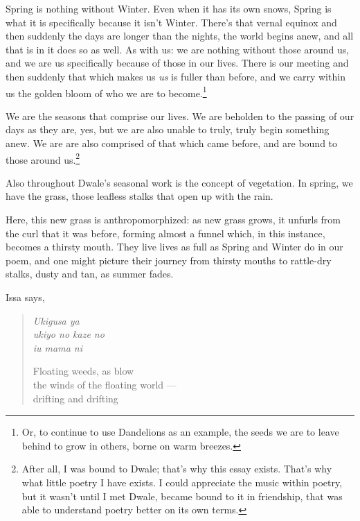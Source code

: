 \documentclass[12pt]{memoir}
\begin{document}
Spring is nothing without Winter. Even when it has its own snows, Spring is what it is specifically because it isn't Winter. There's that vernal equinox and then suddenly the days are longer than the nights, the world begins anew, and all that is in it does so as well. As with us: we are nothing without those around us, and we are us specifically because of those in our lives. There is our meeting and then suddenly that which makes us \emph{us} is fuller than before, and we carry within us the golden bloom of who we are to become.\footnote{Or, to continue to use Dandelions as an example, the seeds we are to leave behind to grow in others, borne on warm breezes.}

We are the seasons that comprise our lives. We are beholden to the passing of our days as they are, yes, but we are also unable to truly, truly begin something anew. We are are also comprised of that which came before, and are bound to those around us.\footnote{After all, I was bound to Dwale; that's why this essay exists. That's why what little poetry I have exists. I could appreciate the music within poetry, but it wasn't until I met Dwale, became bound to it in friendship, that was able to understand poetry better on its own terms.}

Also throughout Dwale's seasonal work is the concept of vegetation. In spring, we have the grass, those leafless stalks that open up with the rain.

Here, this new grass is anthropomorphized: as new grass grows, it unfurls from the curl that it was before, forming almost a funnel which, in this instance, becomes a thirsty mouth. They live lives as full as Spring and Winter do in our poem, and one might picture their journey from thirsty mouths to rattle-dry stalks, dusty and tan, as summer fades.

Issa says,

\begin{verse}
\begin{multicols}{2}
\emph{Ukigusa ya} \\
\emph{ukiyo no kaze no} \\
\emph{iu mama ni}

\columnbreak

Floating weeds, as blow \\
the winds of the floating world --- \\
drifting and drifting
\end{multicols}
\vspace{-1em}
\parencite[18]{issa}
\end{verse}
\end{document}

